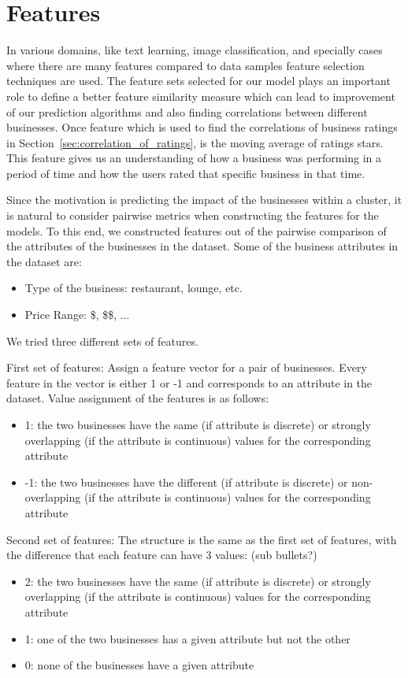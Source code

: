 \documentclass{vldb}
\begin{document}
\section{Features}
In various domains, like text learning, image classification, and specially cases where there are many features compared to data samples feature selection techniques are used. The feature sets selected for our model plays an important role to define a better feature similarity measure which can lead to improvement of our prediction algorithms and also finding correlations between different businesses.
Once feature which is used to find the correlations of business ratings in Section~\ref{sec:correlation_of_ratings}, is the moving average of ratings stars. This feature gives us an understanding of how a business was performing in a period of time and how the users rated that specific business in that time.

Since the motivation is predicting the impact of the businesses within a cluster, it is natural to consider pairwise metrics when constructing the features for the models. To this end, we constructed features out of the pairwise comparison of the attributes of the businesses in the dataset. Some of the business attributes in the dataset are:
\begin{itemize}
  \item Type of the business: restaurant, lounge, etc.
  \item Price Range: \$, \$\$, ...
\end{itemize}

We tried three different sets of features.

First set of features: Assign a feature vector for a pair of businesses. Every feature in the vector is either 1 or -1 and corresponds to an attribute in the dataset. Value assignment of the features is as follows:
\begin{itemize}
\item 1: the two businesses have the same (if attribute is discrete) or strongly overlapping (if the attribute is continuous) values for the corresponding attribute
\item -1: the two businesses have the different (if attribute is discrete) or non-overlapping (if the attribute is continuous) values for the corresponding attribute
\end{itemize}

Second set of features: The structure is the same as the first set of features, with the difference that each feature can have 3 values:
(sub bullets?)
\begin{itemize}
\item 2: the two businesses have the same (if attribute is discrete) or strongly overlapping (if the attribute is continuous) values for the corresponding attribute
\item 1: one of the two businesses has a given attribute but not the other
\item 0: none of the businesses have a given attribute
\end{itemize}
\end{document}
